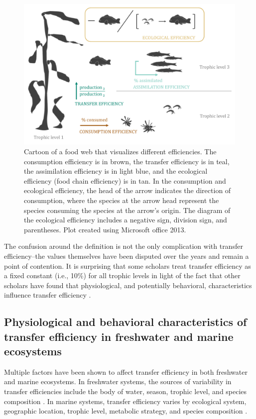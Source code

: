 \documentclass[oneside,12pt,final]{sty/ucthesis-CA2012}
\let\cite\citep                             %
\begin{document}
\begin{mainmatter}
\begin{figure}[H]
     \centering
       \includegraphics[width=\textwidth]{fig/foodwebimage}
    \caption{Cartoon of a food web that visualizes different efficiencies. The consumption efficiency is in brown, the transfer efficiency is in teal, the assimilation efficiency is in light blue, and the ecological efficiency (food chain efficiency) is in tan. In the consumption and ecological efficiency, the head of the arrow indicates the direction of consumption, where the species at the arrow head represent the species consuming the species at the arrow's origin. The diagram of the ecological efficiency includes a negative sign, division sign, and parentheses. Plot created using Microsoft office 2013.}
    \label{foodweb}
\end{figure}

The confusion around the definition is not the only complication with transfer efficiency--the values themselves have been disputed over the years and remain a point of contention. It is surprising that some scholars treat transfer efficiency as a fixed constant (i.e., 10\%) for all trophic levels in light of the fact that other scholars have found that physiological, and potentially behavioral, characteristics influence transfer efficiency \cite{may1983ecology, pauly1995primary, ware2000aquatic, cury2005trophodynamic, libralato2008novel, chassot2010global, trebilco2013ecosystem, watson2014primary}.

\subsection*{Physiological and behavioral characteristics of transfer efficiency in freshwater and marine ecosystems}
Multiple factors have been shown to affect transfer efficiency in both freshwater and marine ecosystems. In freshwater systems, the sources of variability in transfer efficiencies include the body of water, season, trophic level, and species composition \cite{lindeman1942trophic, gaedke1994seasonal, rybarczyk2003analysis, karlsson2007differences}.
In marine systems, transfer efficiency varies by ecological system, geographic location, trophic level, metabolic strategy, and species composition \cite{may1983ecology, persson2007food, libralato2008novel, barnes2010global}.


\end{mainmatter}
\end{document}
